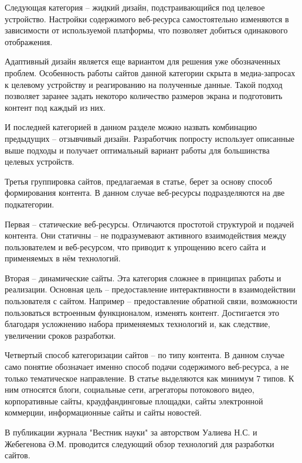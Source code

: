Следующая категория -- жидкий дизайн, подстраивающийся под целевое устройство.
Настройки содержимого веб-ресурса самостоятельно изменяются в зависимости от используемой платформы, что позволяет добиться одинакового отображения.

Адаптивный дизайн является еще вариантом для решения уже обозначенных проблем.
Особенность работы сайтов данной категории скрыта в медиа-запросах к целевому устройству и реагированию на полученные данные.
Такой подход позволяет заранее задать некоторо количество размеров экрана и подготовить контент под каждый из них.

И последней категорией в данном разделе можно назвать комбинацию предыдущих -- отзывчивый дизайн.
Разработчик попросту использует описанные выше подходы и получает оптимальный вариант работы для большинства целевых устройств.


Третья группировка сайтов, предлагаемая в статье, берет за основу способ формирования контента.
В данном случае веб-ресурсы подразделяются на две подкатегории.

Первая -- статические веб-ресурсы.
Отличаются простотой структурой и подачей контента.
Они статичны -- не подразумевают активного взаимодействия между пользователем и веб-ресурсом, что приводит к упрощению всего сайта и применяемых в нём технологий.

Вторая -- динамические сайты.
Эта категория сложнее в принципах работы и реализации.
Основная цель -- предоставление интерактивности в взаимодействии пользователя с сайтом.
Например -- предоставление обратной связи, возможности пользоваться встроенным функционалом, изменять контент.
Достигается это благодаря усложнению набора применяемых технологий и, как следствие, увеличении сроков разработки.


Четвертый способ категоризации сайтов -- по типу контента.
В данном случае само понятие обозначает именно способ подачи содержимого веб-ресурса, а не только тематическое направление.
В статье выделяются как минимум 7 типов.
К ним относятся блоги, социальные сети, агрегаторы потокового видео, корпоративные сайты, краудфандинговые площадки, сайты электронной коммерции, информационные сайты и сайты новостей.


В публикации журнала "Вестник науки" за авторством Уалиева Н.С. и Жебегенова Ә.М. \cite{ualiev-jebegenov-issledovanie} проводится следующий обзор технологий для разработки сайтов.

